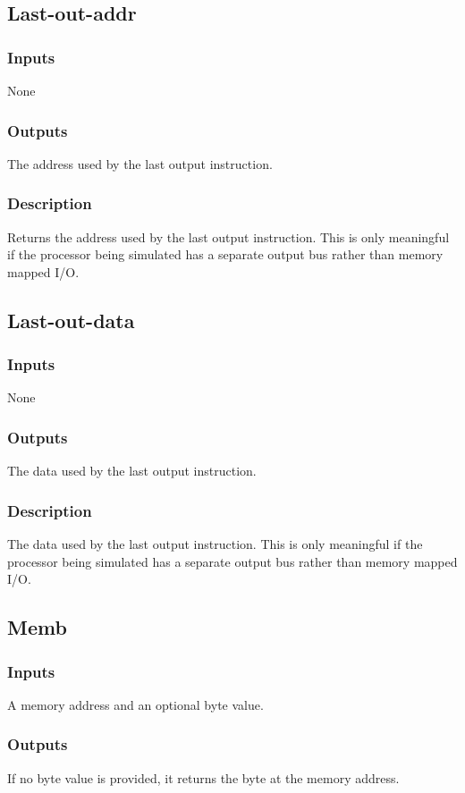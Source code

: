 \documentclass[10pt, openany]{book}
\begin{document}
\subsection{Last-out-addr}
\subsubsection{Inputs}
None
\subsubsection{Outputs}
The address used by the last output instruction.
\subsubsection{Description}
Returns the address used by the last output instruction.  This is only meaningful if the processor being simulated has a separate output bus rather than memory mapped I/O.

\subsection{Last-out-data}
\subsubsection{Inputs}
None
\subsubsection{Outputs}
The data used by the last output instruction.
\subsubsection{Description}
The data used by the last output instruction.  This is only meaningful if the processor being simulated has a separate output bus rather than memory mapped I/O.

\subsection{Memb}
\subsubsection{Inputs}
A memory address and an optional byte value.
\subsubsection{Outputs}
If no byte value is provided, it returns the byte at the memory address.
\end{document}
